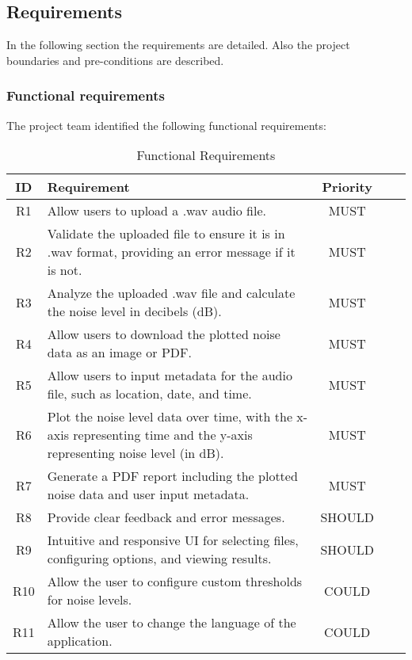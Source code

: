 \subsection{Requirements}
In the following section the requirements are detailed. Also the project boundaries and pre-conditions are described.

\subsubsection{Functional requirements}
The project team identified the following functional requirements:
\begin{table}[H]
    \centering
    \begin{tabularx}{\textwidth}{|c|X|c|c|c|}
        \hline
        \textbf{ID} & \textbf{Requirement} & \textbf{Priority} \\
        \hline
        R1 & Allow users to upload a .wav audio file. & MUST \\
        \hline
        R2 & Validate the uploaded file to ensure it is in .wav format, providing an error message if it is not. & MUST \\
        \hline
        R3 & Analyze the uploaded .wav file and calculate the noise level in decibels (dB). & MUST \\
        \hline
        R4 & Allow users to download the plotted noise data as an image or PDF. & MUST \\
        \hline
        R5 & Allow users to input metadata for the audio file, such as location, date, and time. & MUST \\
        \hline
        R6 & Plot the noise level data over time, with the x-axis representing time and the y-axis representing noise level (in dB). & MUST \\
        \hline
        R7 & Generate a PDF report including the plotted noise data and user input metadata. & MUST \\
        \hline
        R8 & Provide clear feedback and error messages. & SHOULD \\
        \hline
        R9 & Intuitive and responsive UI for selecting files, configuring options, and viewing results. & SHOULD \\
        \hline
        R10 & Allow the user to configure custom thresholds for noise levels. & COULD \\
        \hline
        R11 & Allow the user to change the language of the application. & COULD \\
        \hline
    \end{tabularx}
    \caption{Functional Requirements}
    \label{table:functional_requirements}
\end{table}

